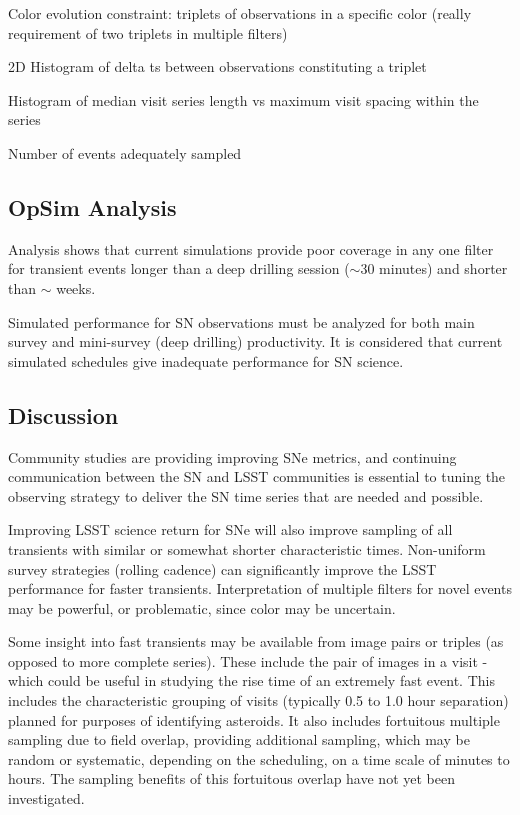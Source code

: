 Color evolution constraint: triplets of observations in a specific
color (really requirement of two triplets in multiple filters)

  2D Histogram of delta ts between observations constituting a triplet

Histogram of median visit series length vs maximum visit spacing
within the series

Number of events adequately sampled


\subsection{OpSim Analysis}
\label{sec:\chpname:analysis}

Analysis shows that current simulations provide  poor coverage in any one filter for transient events longer than a deep drilling session ($\sim$30 minutes) and shorter than $\sim$ weeks.

Simulated performance for SN observations must be analyzed for both
main survey and mini-survey (deep drilling) productivity.  It is
considered that current simulated schedules give inadequate
performance for SN science.




\subsection{Discussion}
\label{sec:\chpname:discussion}

Community studies are providing improving SNe metrics, and continuing
communication between the SN and LSST communities is essential to
tuning the observing strategy to deliver the SN time series that are
needed and possible.

Improving LSST science return for SNe will also improve sampling of
all transients with similar or somewhat shorter characteristic times.
Non-uniform survey strategies (rolling cadence) can significantly
improve the LSST performance for faster transients.  Interpretation of
multiple filters for novel events may be powerful, or problematic,
since color may be uncertain.

Some insight into fast transients may be available from image pairs or
triples (as opposed to more complete series).  These include the pair
of images in a visit - which could be useful in studying the rise time
of an extremely fast event.  This includes the characteristic grouping
of visits (typically 0.5 to 1.0 hour separation) planned for purposes
of identifying asteroids.  It also includes fortuitous multiple
sampling due to field overlap, providing additional sampling, which
may be random or systematic, depending on the scheduling, on a time
scale of minutes to hours.  The sampling benefits of this fortuitous
overlap have not yet been investigated.


